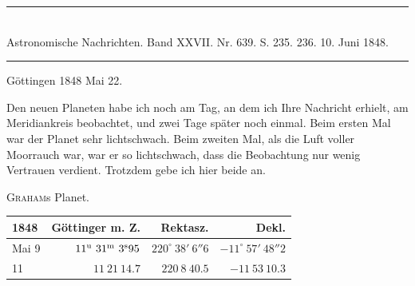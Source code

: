 \clearpage
{}
\begin{center}
\rule{0.55\linewidth}{0.4pt}\\[2pt]
Astronomische Nachrichten. Band XXVII. Nr. 639. S. 235. 236. 10. Juni 1848.\\[2pt]
\rule{0.55\linewidth}{0.4pt}
\end{center}
\begin{flushright}Göttingen 1848 Mai\raisebox{.35ex}{,} 22.\end{flushright}

Den neuen Planeten habe ich noch am Tag, an dem ich Ihre Nachricht erhielt, am Meridiankreis beobachtet, und zwei Tage später noch einmal. Beim ersten Mal war der Planet sehr lichtschwach. Beim zweiten Mal, als die Luft voller Moorrauch war, war er so lichtschwach, dass die Beobachtung nur wenig Vertrauen verdient. Trotzdem gebe ich hier beide an.

\begin{center}
\textsc{Graham}s Planet.\\[3pt]
\setlength{\tabcolsep}{4pt}
\begin{tabular}{l|r|r|r}
1848 & Göttinger m. Z. & Rektasz. & Dekl. \\\hline
Mai 9 & $11^{\rm u}\ 31^{\rm m}\ 3^{\rm s}95$ & $220^\circ\ 38'\ 6''6$ & $-11^\circ\ 57'\ 48''2$ \\
\hfill 11 & $11\ 21\ 14.7$ & $220\ 8\ 40.5$ & $-11\ 53\ 10.3$ \\
\end{tabular}
\end{center}

